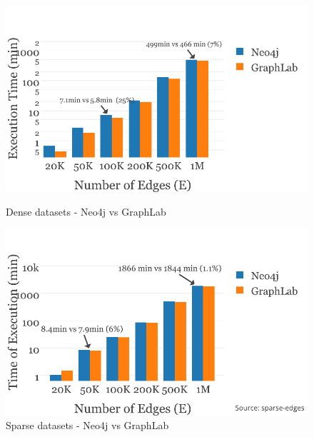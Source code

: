	\begin{figure}
		\begin{minipage}{.5\textwidth}
			\centering
			\includegraphics[scale=0.5]{Graphs/dense-edges.pdf}
			\caption{Dense datasets - Neo4j vs GraphLab\label{fig:dense-edges}}
		\end{minipage}
		\begin{minipage}{.5\textwidth}
			\centering
			\includegraphics[scale=0.5]{Graphs/sparse-edges.pdf}
			\caption{Sparse datasets - Neo4j vs GraphLab\label{fig:sparse-edges}}
		\end{minipage}
	\end{figure}
	
